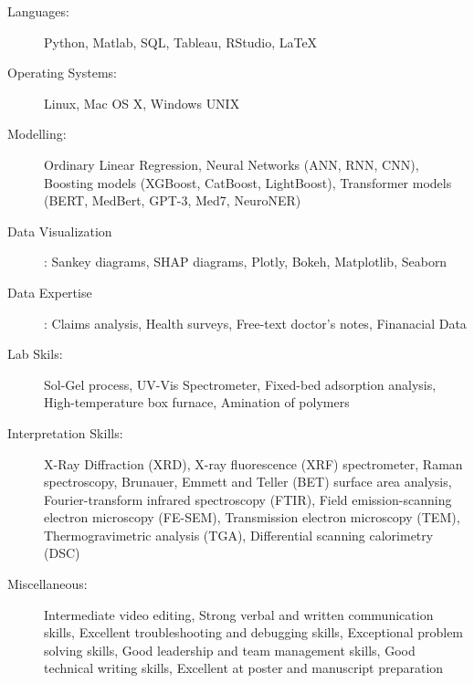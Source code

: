 \documentclass[letterpaper,11pt]{article}
\begin{document}
\begin{description}
\item[Languages:]
Python, Matlab, SQL, Tableau, RStudio, \LaTeX
\item[Operating Systems:]
Linux, Mac OS X, Windows {\sc UNIX}
\item[Modelling:]
Ordinary Linear Regression, Neural Networks (ANN, RNN, CNN), Boosting models (XGBoost, CatBoost, LightBoost), Transformer models (BERT, MedBert, GPT-3, Med7, NeuroNER)
\item [Data Visualization]:
Sankey diagrams, SHAP diagrams, Plotly, Bokeh, Matplotlib, Seaborn
\item[Data Expertise]:
Claims analysis, Health surveys, Free-text doctor's notes, Finanacial Data
\pagebreak
\item[Lab Skils:]
Sol-Gel process, UV-Vis Spectrometer, Fixed-bed adsorption analysis, High-temperature box furnace, Amination of polymers
\item[Interpretation Skills:]
X-Ray Diffraction (XRD), X-ray fluorescence (XRF) spectrometer, Raman spectroscopy, Brunauer, Emmett and Teller (BET) surface area analysis, 
Fourier-transform infrared spectroscopy (FTIR), Field emission-scanning electron microscopy (FE-SEM), Transmission electron microscopy (TEM), Thermogravimetric analysis (TGA), 
Differential scanning calorimetry (DSC)
\item[Miscellaneous:]
Intermediate video editing, Strong verbal and written communication skills, Excellent troubleshooting and debugging skills, Exceptional problem solving skills, Good leadership and team management skills, 
Good technical writing skills, Excellent at poster and manuscript preparation

\end{description}
\end{document}
